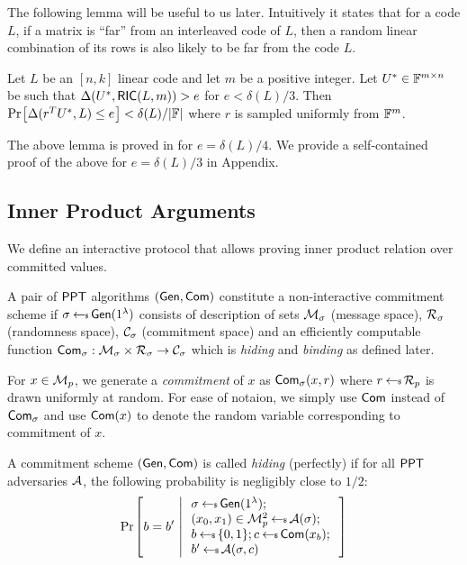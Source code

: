 The following lemma will be useful to us later. Intuitively it states that for a code $L$, if a matrix is ``far'' from an interleaved code of $L$, then a random linear combination of its rows is also likely to be far from the code $L$. 

\begin{lemma}\label{lem:proximitytest}
Let $L$ be an $[n,k]$ linear code and let $m$ be a positive integer. Let $U^*\in \mathbb{F}^{m\times n}$ be such that $\Delta(U^\ast,\mathsf{RIC}(L,m))>e$ for $e<\delta(L)/3$. Then $\prob{\dham(r^TU^*,L)\leq e}<\delta(L)/|\bbF|$ where $r$ is sampled uniformly from $\mathbb{F}^m$.
\end{lemma}
The above lemma is proved in \cite{ligero} for $e=\delta(L)/4$. We provide a self-contained proof of the above for $e=\delta(L)/3$ in Appendix.


\subsection{Inner Product Arguments}
We define an interactive protocol that allows proving inner product relation over committed values. 
\begin{definition}\label{defn:commscheme}
 A pair of $\mathsf{PPT}$ algorithms $(\mathsf{Gen},\mathsf{Com})$ constitute a non-interactive commitment scheme if $\sigma\hskip2.3pt{\gets\!\!\mbox{\tiny${\$}$\normalsize}}\, \mathsf{Gen}(1^{\lambda})$ consists of description of sets $\mathcal{M}_\sigma$ (message space), $\mathcal{R}_\sigma$ (randomness space), $\mathcal{C}_\sigma$ (commitment space) and an efficiently computable function $\mathsf{Com}_\sigma: \mathcal{M}_\sigma\times \mathcal{R}_\sigma\rightarrow \mathcal{C}_\sigma$ which is {\em hiding} and {\em binding} as defined later.
\end{definition}

For $x\in \mathcal{M}_p$, we generate a {\em commitment} of $x$ as $\mathsf{Com}_\sigma(x,r)$ where $r\hskip2.3pt{\gets\!\!\mbox{\tiny${\$}$\normalsize}}\, \mathcal{R}_p$ is drawn uniformly at random. For ease of notaion, we simply use $\mathsf{Com}$ instead of $\mathsf{Com}_\sigma$ and use $\mathsf{Com}(x)$ to denote the random variable corresponding to commitment of $x$. 

\begin{definition}\label{defn:hidingcomm}
A commitment scheme $(\mathsf{Gen},\mathsf{Com})$ is called {\em hiding} (perfectly) if for all $\mathsf{PPT}$ adversaries $\mathcal{A}$, the following probability is negligibly close to $1/2$:
\begin{align*}
\condprob{b=b'}{
\begin{array}{l}
\sigma\sample \gen(\secparam); \\
(x_0,x_1)\in \calM^2_p\sample \adv(\sigma); \\
b\sample \bitset; c\sample \com(x_b);\\
b'\sample \adv(\sigma,c)
\end{array}
}
\end{align*}
\end{definition}

